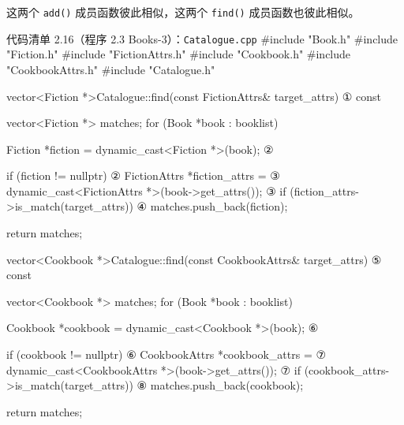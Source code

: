 这两个 \texttt{add()} 成员函数彼此相似，这两个 \texttt{find()} 成员函数也彼此相似。

\begin{codeboxt}{代码清单 2.16（程序 2.3 Books-3）：\texttt{Catalogue.\allowbreak{}cpp}}
#include "Book.h"
#include "Fiction.h"
#include "FictionAttrs.h"
#include "Cookbook.h"
#include "CookbookAttrs.h"
#include "Catalogue.h"

vector<Fiction *>Catalogue::find(const FictionAttrs& target_attrs)   ①
    const
{
    vector<Fiction *> matches;
    for (Book *book : booklist)
    {
        Fiction *fiction = dynamic_cast<Fiction *>(book);            ②

        if (fiction != nullptr)                                      ②
        {
            FictionAttrs *fiction_attrs =                            ③
                    dynamic_cast<FictionAttrs *>(book->get_attrs()); ③
            if (fiction_attrs->is_match(target_attrs))               ④
            {
                matches.push_back(fiction);
            }
        }
    }

    return matches;
}

vector<Cookbook *>Catalogue::find(const CookbookAttrs& target_attrs)  ⑤
    const
{
    vector<Cookbook *> matches;
    for (Book *book : booklist)
    {
        Cookbook *cookbook = dynamic_cast<Cookbook *>(book);          ⑥

        if (cookbook != nullptr)                                      ⑥
        {
            CookbookAttrs *cookbook_attrs =                           ⑦
                    dynamic_cast<CookbookAttrs *>(book->get_attrs()); ⑦
            if (cookbook_attrs->is_match(target_attrs))               ⑧
            {
                matches.push_back(cookbook);
            }
        }
    }

    return matches;
}
\end{codeboxt}
\par
{}\par
{}\par
{}\par
{}\par
{}\par
{}\par
{}\par

